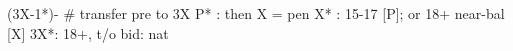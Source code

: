 (3X-1*)- # transfer pre to 3X
P* : then X = pen
X* : 15-17 [P]; or 18+ near-bal [X]
3X*: 18+, t/o
bid: nat